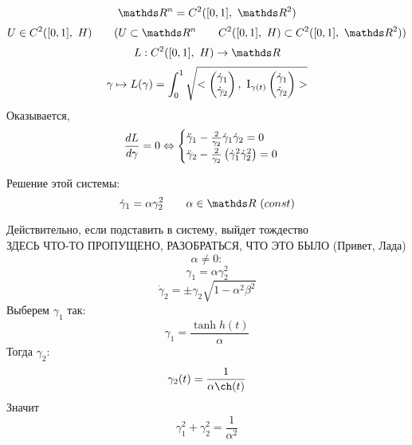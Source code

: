 \documentclass[main]{subfiles}
\begin{document}
    \begin{Utv}
      \[\R^n = C^2 ([0,1],\ \R^2)\]
      \[U \in C^2 ([0,1],\ H) \qq (U \subset \R^n \qq C^2 ([0,1],\ H) \subset C^2 ([0,1],\ \R^2))\]
      \[L: C^2 ([0,1],\ H) \ra \R\]
      \[\gamma \mapsto L(\gamma) = \int_0^1 \sqrt{<\begin{pmatrix}
        \dot{\gamma}_1\\
        \dot{\gamma}_2
      \end{pmatrix},\ \RNumb{1}_{\gamma(t)} \begin{pmatrix}
        \dot{\gamma}_1\\
        \dot{\gamma}_2
      \end{pmatrix}>}\]
      Оказывается,
      \[\frac{d L}{d \gamma} = 0 \Leftrightarrow \begin{cases}
      \ddot{\gamma}_1 - \frac{2}{\gamma_2} \dot{\gamma}_1 \dot{\gamma}_2 = 0\\
      \ddot{\gamma}_2 - \frac{2}{\gamma_2} \left(\dot{\gamma}_1^2 \dot{\gamma}_2^2\right) = 0
      \end{cases}\]
    \end{Utv}

    \begin{utv}
        Решение этой системы:
        \[\dot{\gamma}_1 = \alpha \gamma_2^2 \qq \alpha \in \R \ (const)\]
    \end{utv}

    \begin{sol}
        Действительно, если подставить в систему, выйдет тождество\\
        ЗДЕСЬ ЧТО-ТО ПРОПУЩЕНО, РАЗОБРАТЬСЯ, ЧТО ЭТО БЫЛО (Привет, Лада)
        \[\alpha \neq 0:\]
        \[\gamma_1 = \alpha \gamma_2^2\]
        \[\dot{\gamma}_2 = \pm \gamma_2 \sqrt{1 - \alpha^2 \beta^2}\]
        Выберем $\gamma_1$ так:
        \[\gamma_1 = \frac{\tanh h(t)}{\alpha}\]
        Тогда $\gamma_2$:
        \[\gamma_2 (t) = \frac{1}{\alpha \ch(t)}\]
        Значит
        \[\gamma_1^2 + \gamma_2^2 = \frac{1}{\alpha^2}\]
    \end{sol}
\end{document}
